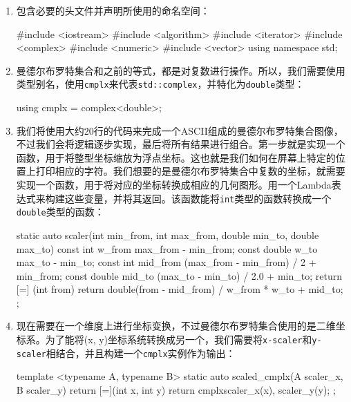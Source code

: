\begin{enumerate}
\item 包含必要的头文件并声明所使用的命名空间：

\begin{codebox}[cpp]
#include <iostream>
#include <algorithm>
#include <iterator>
#include <complex>
#include <numeric>
#include <vector>
using namespace std;
\end{codebox}

\item 曼德尔布罗特集合和之前的等式，都是对复数进行操作。所以，我们需要使用类型别名，使用\texttt{cmplx}来代表\texttt{std::complex}，并特化为\texttt{double}类型：

\begin{codebox}[cpp]
using cmplx = complex<double>;
\end{codebox}

\item 我们将使用大约20行的代码来完成一个ASCII组成的曼德尔布罗特集合图像，不过我们会将逻辑逐步实现，最后将所有结果进行组合。第一步就是实现一个函数，用于将整型坐标缩放为浮点坐标。这也就是我们如何在屏幕上特定的位置上打印相应的字符。我们想要的是曼德尔布罗特集合中复数的坐标，就需要实现一个函数，用于将对应的坐标转换成相应的几何图形。用一个Lambda表达式来构建这些变量，并将其返回。该函数能将\texttt{int}类型的函数转换成一个\texttt{double}类型的函数：

\begin{codebox}[cpp]
static auto scaler(int min_from, int max_from,
double min_to, double max_to)
{
    const int w_from {max_from - min_from};
    const double w_to {max_to - min_to};
    const int mid_from {(max_from - min_from) / 2 + min_from};
    const double mid_to {(max_to - min_to) / 2.0 + min_to};
    return [=] (int from) {
        return double(from - mid_from) / w_from * w_to + mid_to;
    };
}
\end{codebox}

\item 现在需要在一个维度上进行坐标变换，不过曼德尔布罗特集合使用的是二维坐标系。为了能将(x, y)坐标系统转换成另一个，我们需要将\texttt{x-scaler}和\texttt{y-scaler}相结合，并且构建一个\texttt{cmplx}实例作为输出：

\begin{codebox}[cpp]
template <typename A, typename B>
static auto scaled_cmplx(A scaler_x, B scaler_y)
{
    return [=](int x, int y) {
        return cmplx{scaler_x(x), scaler_y(y)};
    };
}
\end{codebox}


\end{enumerate}

